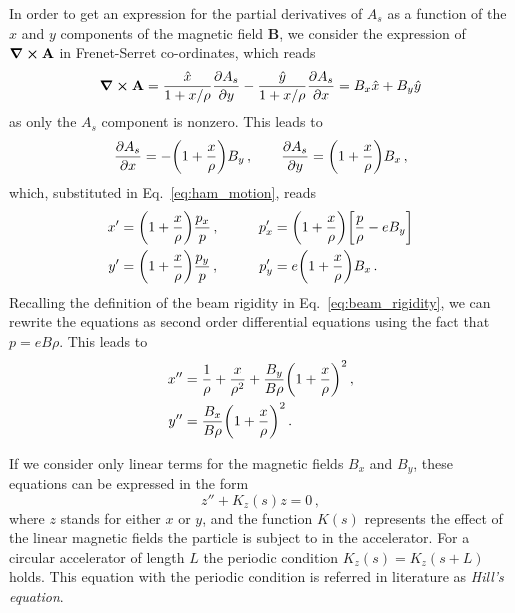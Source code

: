 In order to get an expression for the partial derivatives of $A_s$ as a function of the $x$ and $y$ components of the magnetic field $\mathbf{B}$, we consider the expression of $\curl \mathbf{A}$ in Frenet-Serret co-ordinates, which reads
%
\begin{equation}
    \curl \mathbf{A} = \frac{\hat x}{1+x/\rho}\pdv{A_s}{y} - \frac{\hat y}{1+x/\rho}\pdv{A_s}{x} = B_x\hat x + B_y\hat y %
\end{equation}
%
as only the $A_s$ component is nonzero. This leads to
%
\begin{equation}
    \pdv{A_s}{x} = -\qty(1+\frac{x}{\rho})B_y\,, \qquad \pdv{A_s}{y} = \qty(1+\frac{x}{\rho})B_x\,,
\end{equation}
%
which, substituted in Eq.~\eqref{eq:ham_motion}, reads
%
\begin{equation} 
    \begin{aligned}
        x' &= \qty(1+\frac{x}{\rho})\frac{p_x}{p}\,, &\qquad p'_x &= \qty(1+\frac{x}{\rho})\qty[ \frac{p}{\rho} - eB_y]\\
        y' &= \qty(1+\frac{x}{\rho})\frac{p_y}{p}\,, &\qquad p'_y &= e\qty(1+\frac{x}{\rho})B_x\,.
    \end{aligned}
\end{equation}
%
Recalling the definition of the beam rigidity in Eq.~\eqref{eq:beam_rigidity}, we can rewrite the equations as second order differential equations using the fact that $p=eB\rho$. This leads to
%
\begin{equation}
    \begin{split}
        x'' &= \frac{1}{\rho} + \frac{x}{\rho^2} + \frac{B_y}{B\rho}\qty(1+\frac{x}{\rho})^2\,,\\
        y'' &= \frac{B_x}{B\rho}\qty(1+\frac{x}{\rho})^2\,.
    \end{split}
    \label{eq:acc_step_1}
\end{equation} 

If we consider only linear terms for the magnetic fields $B_x$ and $B_y$, these equations can be expressed in the form 
\begin{equation}
	z''+K_z(s)z = 0\, ,
    \label{eq:acc_step_2}
\end{equation}
where $z$ stands for either $x$ or $y$, and the function $K(s)$ represents the effect of the linear magnetic fields the particle is subject to in the accelerator.  For a circular accelerator of length $L$ the periodic condition $K_z(s)=K_z(s+L)$ holds. This equation with the periodic condition is referred in literature as \textit{Hill's equation}.


